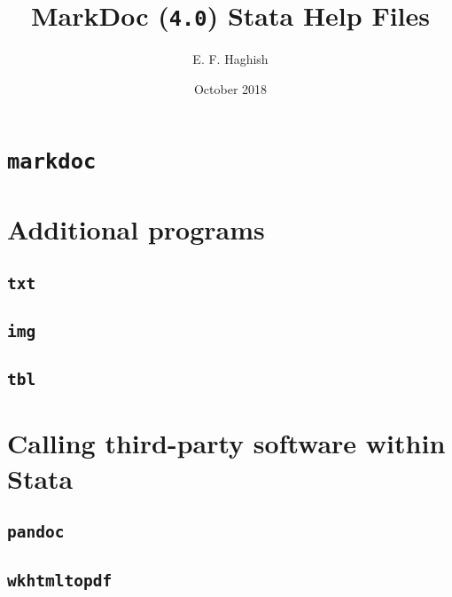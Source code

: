 \documentclass[a4paper,12pt]{book}
\begin{document}
\author{E. F. Haghish}
\title{MarkDoc (\texttt{4.0}) Stata Help Files}
\date{October 2018}

\frontmatter
\maketitle
\tableofcontents

\mainmatter

\section{\texttt{markdoc}} \label{markdoc}


\section{Additional programs} \label{additional programs}
\subsection{\texttt{txt}} \label{txt}

\subsection{\texttt{img}} \label{img}

\subsection{\texttt{tbl}} \label{tbl}

\section{Calling third-party software within Stata} \label{Calling third-party software within Stata}
\subsection{\texttt{pandoc}} \label{pandoc}

\subsection{\texttt{wkhtmltopdf}} \label{wkhtmltopdf}





%
%

\backmatter
\end{document}
